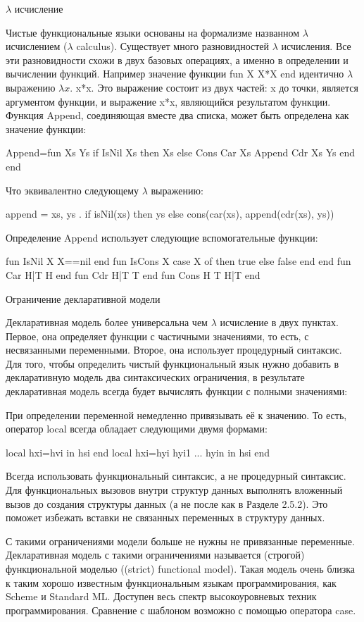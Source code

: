 $\lambda$ исчисление

Чистые функциональные языки основаны на формализме названном $\lambda$ исчислением ($\lambda$ calculus). Существует много разновидностей $\lambda$ исчисления. Все эти разновидности схожи в двух базовых операциях, а именно в определении и вычислении функций. Например значение функции fun { X} X*X end идентично $\lambda$ выражению $\lambda x$. x*x. Это выражение состоит из двух частей: x до точки, является аргументом функции, и выражение x*x, являющийся результатом функции. Функция Append, соединяющая вместе два списка, может быть определена как значение функции:

Append=fun { Xs Ys}
if {IsNil Xs} then Xs
else {Cons {Car Xs} {Append {Cdr Xs} Ys}}
end
end

Что эквивалентно следующему $\lambda$ выражению:

append = xs, ys . if isNil(xs) then ys
else cons(car(xs), append(cdr(xs), ys))

Определение Append использует следующие вспомогательные функции:

fun
{IsNil X} X==nil end
fun
{IsCons X} case X of  then true else false end end
fun
{Car H|T} H end
fun
{Cdr H|T} T end
fun
{Cons H T} H|T end

Ограничение декларативной модели

Декларативная модель более универсальна чем $\lambda$ исчисление в двух пунктах. Первое, она определяет функции с частичными значениями, то есть, с несвязанными переменными. Второе, она использует процедурный синтаксис. Для того, чтобы определить чистый функциональный язык нужно добавить в декларативную модель два синтаксических ограничения, в результате декларативная модель всегда будет вычислять функции с полными значениями:

При определении переменной немедленно привязывать её к значению. То есть, оператор local всегда обладает следующими двумя формами:

local hxi=hvi in hsi end
local hxi={hyi hyi1 ... hyin } in hsi end

Всегда использовать функциональный синтаксис, а не процедурный синтаксис. Для функциональных вызовов внутри структур данных выполнять вложенный вызов до создания структуры данных (а не после как в Разделе 2.5.2). Это поможет избежать вставки не связанных переменных в структуру данных.

С такими ограничениями модели больше не нужны не привязанные переменные. Декларативная модель с такими ограничениями называется (строгой) функциональной моделью ((strict) functional model). Такая модель очень близка к таким хорошо известным функциональным языкам программирования, как Scheme и Standard ML. Доступен весь спектр высокоуровневых техник программирования. Сравнение с шаблоном возможно с помощью оператора case.

